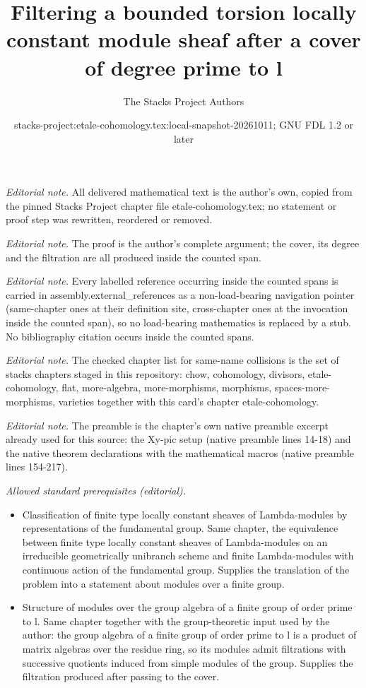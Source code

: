 \documentclass[10pt,a4paper]{amsart}
\title{Filtering a bounded torsion locally constant module sheaf after a cover of degree prime to l}
\author{The Stacks Project Authors}
\date{stacks-project:etale-cohomology.tex:local-snapshot-20261011; GNU FDL 1.2 or later}
\theoremstyle{plain}
\theoremstyle{definition}
\theoremstyle{remark}
\numberwithin{equation}{subsection}
\begin{document}
\maketitle
\noindent\textit{Editorial note.} All delivered mathematical text is the author's own, copied from the pinned Stacks Project chapter file etale-cohomology.tex; no statement or proof step was rewritten, reordered or removed.\par\medskip
\noindent\textit{Editorial note.} The proof is the author's complete argument; the cover, its degree and the filtration are all produced inside the counted span.\par\medskip
\noindent\textit{Editorial note.} Every labelled reference occurring inside the counted spans is carried in assembly.external\_references as a non-load-bearing navigation pointer (same-chapter ones at their definition site, cross-chapter ones at the invocation inside the counted span), so no load-bearing mathematics is replaced by a stub. No bibliography citation occurs inside the counted spans.\par\medskip
\noindent\textit{Editorial note.} The checked chapter list for same-name collisions is the set of stacks chapters staged in this repository: chow, cohomology, divisors, etale-cohomology, flat, more-algebra, more-morphisms, morphisms, spaces-more-morphisms, varieties together with this card's chapter etale-cohomology.\par\medskip
\noindent\textit{Editorial note.} The preamble is the chapter's own native preamble excerpt already used for this source: the Xy-pic setup (native preamble lines 14-18) and the native theorem declarations with the mathematical macros (native preamble lines 154-217).\par\medskip
\noindent\textit{Allowed standard prerequisites (editorial).}\begin{itemize}
\item Classification of finite type locally constant sheaves of Lambda-modules by representations of the fundamental group. Same chapter, the equivalence between finite type locally constant sheaves of Lambda-modules on an irreducible geometrically unibranch scheme and finite Lambda-modules with continuous action of the fundamental group. Supplies the translation of the problem into a statement about modules over a finite group.
\item Structure of modules over the group algebra of a finite group of order prime to l. Same chapter together with the group-theoretic input used by the author: the group algebra of a finite group of order prime to l is a product of matrix algebras over the residue ring, so its modules admit filtrations with successive quotients induced from simple modules of the group. Supplies the filtration produced after passing to the cover.
\end{itemize}\medskip
\end{document}
